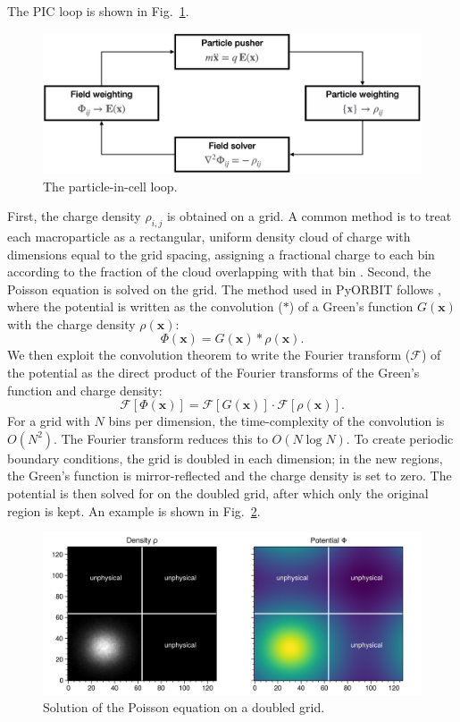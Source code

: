 The PIC loop is shown in Fig.~\ref{fig:pic_loop}. 
%
\begin{figure}[!p]
    \centering
    \includegraphics[width=\textwidth]{Images/chapter3/pic_loop.png}
    \caption{\label{fig:pic_loop}The particle-in-cell loop.}
\end{figure}
%
First, the charge density $\rho_{i,j}$ is obtained on a grid. A common method is to treat each macroparticle as a rectangular, uniform density cloud of charge with dimensions equal to the grid spacing, assigning a fractional charge to each bin according to the fraction of the cloud overlapping with that bin \cite{Birdsall1975}. Second, the Poisson equation is solved on the grid. The method used in PyORBIT follows \cite{Hockney1981}, where the potential is written as the convolution ($*$) of a Green's function $G(\mathbf{x})$ with the charge density $\rho(\mathbf{x})$:
%
\begin{equation}
    \Phi(\mathbf{x}) = G(\mathbf{x}) * \rho(\mathbf{x}).
\end{equation}
%
We then exploit the convolution theorem \cite{Arfken1985} to write the Fourier transform ($\mathcal{F}$) of the potential as the direct product of the Fourier transforms of the Green's function and charge density:
%
\begin{equation}
    \mathcal{F}[\Phi(\mathbf{x})]
    =
    \mathcal{F}[G(\mathbf{x})] \cdot \mathcal{F}[\rho(\mathbf{x})].
\end{equation}
%
For a grid with $N$ bins per dimension, the time-complexity of the convolution is $O(N^2)$. The Fourier transform reduces this to $O(N \log N)$. To create periodic boundary conditions, the grid is doubled in each dimension; in the new regions, the Green's function is mirror-reflected and the charge density is set to zero. The potential is then solved for on the doubled grid, after which only the original region is kept. An example is shown in Fig.~\ref{fig:poisson}. 
%
\begin{figure}[!p]
    \centering
    \includegraphics[width=\textwidth]{Images/chapter3/poisson.png}
    \caption{\label{fig:poisson}Solution of the Poisson equation on a doubled grid.}
\end{figure}
